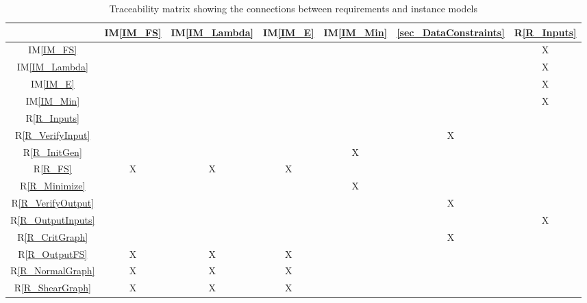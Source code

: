 \documentclass[12pt]{article}
\newcommand{\tref}[1]{T\ref{#1}}
\newcommand{\iref}[1]{IM\ref{#1}}
\newcommand{\ddref}[1]{DD\ref{#1}}
\newcommand{\dref}[1]{GD\ref{#1}}
\newcommand{\rref}[1]{R\ref{#1}}
\begin{document}
\begin{table}[h!]
\centering
\begin{tabular}{|c|c|c|c|c|c|c|}
\hline
& \iref{IM_FS}& \iref{IM_Lambda}& \iref{IM_E}& \iref{IM_Min}& 
\ref{sec_DataConstraints} & \rref{R_Inputs}\\
\hline
\iref{IM_FS}          & & & & & & X\\ \hline
\iref{IM_Lambda}      & & & & & & X\\ \hline
\iref{IM_E}           & & & & & & X\\ \hline
\iref{IM_Min}         & & & & & & X\\ \hline 
\rref{R_Inputs}       & & & & & & \\ \hline
\rref{R_VerifyInput}  & & & & & X& \\ \hline
\rref{R_InitGen}      & & & & X& & \\ \hline
\rref{R_FS}           & X& X& X& & & \\ \hline 
\rref{R_Minimize}     & & & & X& & \\ \hline
\rref{R_VerifyOutput} & & & & & X& \\ \hline
\rref{R_OutputInputs} & & & & & & X \\ \hline
\rref{R_CritGraph}    & & & & & X& \\ \hline
\rref{R_OutputFS}     & X& X& X& & & \\ \hline
\rref{R_NormalGraph}  & X& X& X& & & \\ \hline
\rref{R_ShearGraph}   & X& X& X& & & \\
\hline
\end{tabular}
\caption{Traceability matrix showing the connections between requirements and 
instance models}
\label{Table:R_trace}
\end{table}
%
%
%			
\end{document}
